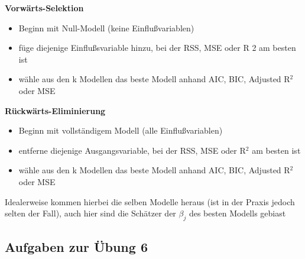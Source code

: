 \textbf{Vorwärts-Selektion}
\begin{itemize}
	\item Beginn mit Null-Modell (keine Einflußvariablen)
	\item füge diejenige Einflußsvariable hinzu, bei der RSS, MSE oder R 2 am besten ist
	\item wähle aus den k Modellen das beste Modell anhand AIC, BIC, Adjusted R$^2$ oder MSE
\end{itemize}

\textbf{Rückwärts-Eliminierung}
\begin{itemize}
	\item Beginn mit vollständigem Modell (alle Einflußvariablen)
	\item entferne diejenige Ausgangsvariable, bei der RSS, MSE oder R$^2$ am besten ist
	\item wähle aus den k Modellen das beste Modell anhand AIC, BIC, Adjusted R$^2$ oder MSE
\end{itemize}

Idealerweise kommen hierbei die selben Modelle heraus (ist in der Praxis jedoch selten der Fall), auch hier sind die Schätzer der $\beta_j$ des besten Modells gebiast

\subsection{Aufgaben zur Übung 6}
